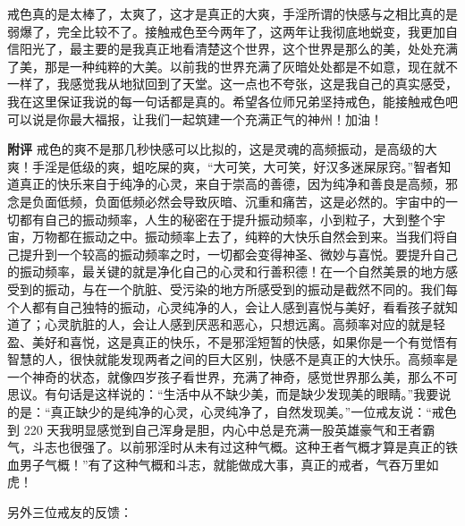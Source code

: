 \begin{case}
    戒色真的是太棒了，太爽了，这才是真正的大爽，手淫所谓的快感与之相比真的是弱爆了，完全比较不了。接触戒色至今两年了，这两年让我彻底地蜕变，我更加自信阳光了，最主要的是我真正地看清楚这个世界，这个世界是那么的美，处处充满了美，那是一种纯粹的大美。以前我的世界充满了灰暗处处都是不如意，现在就不一样了，我感觉我从地狱回到了天堂。这一点也不夸张，这是我自己的真实感受，我在这里保证我说的每一句话都是真的。希望各位师兄弟坚持戒色，能接触戒色吧可以说是你最大福报，让我们一起筑建一个充满正气的神州！加油！

    \textbf{附评} 戒色的爽不是那几秒快感可以比拟的，这是灵魂的高频振动，是高级的大爽！手淫是低级的爽，蛆吃屎的爽，“大可笑，大可笑，好汉多迷屎尿窍。”智者知道真正的快乐来自于纯净的心灵，来自于崇高的善德，因为纯净和善良是高频，邪念是负面低频，负面低频必然会导致灰暗、沉重和痛苦，这是必然的。宇宙中的一切都有自己的振动频率，人生的秘密在于提升振动频率，小到粒子，大到整个宇宙，万物都在振动之中。振动频率上去了，纯粹的大快乐自然会到来。当我们将自己提升到一个较高的振动频率之时，一切都会变得神圣、微妙与喜悦。要提升自己的振动频率，最关键的就是净化自己的心灵和行善积德！在一个自然美景的地方感受到的振动，与在一个肮脏、受污染的地方所感受到的振动是截然不同的。我们每个人都有自己独特的振动，心灵纯净的人，会让人感到喜悦与美好，看看孩子就知道了；心灵肮脏的人，会让人感到厌恶和恶心，只想远离。高频率对应的就是轻盈、美好和喜悦，这是真正的快乐，不是邪淫短暂的快感，如果你是一个有觉悟有智慧的人，很快就能发现两者之间的巨大区别，快感不是真正的大快乐。高频率是一个神奇的状态，就像四岁孩子看世界，充满了神奇，感觉世界那么美，那么不可思议。有句话是这样说的：“生活中从不缺少美，而是缺少发现美的眼睛。”我要说的是：“真正缺少的是纯净的心灵，心灵纯净了，自然发现美。”一位戒友说：“戒色到 220 天我明显感觉到自己浑身是胆，内心中总是充满一股英雄豪气和王者霸气，斗志也很强了。以前邪淫时从未有过这种气概。这种王者气概才算是真正的铁血男子气概！”有了这种气概和斗志，就能做成大事，真正的戒者，气吞万里如虎！

    另外三位戒友的反馈：


\end{case}
